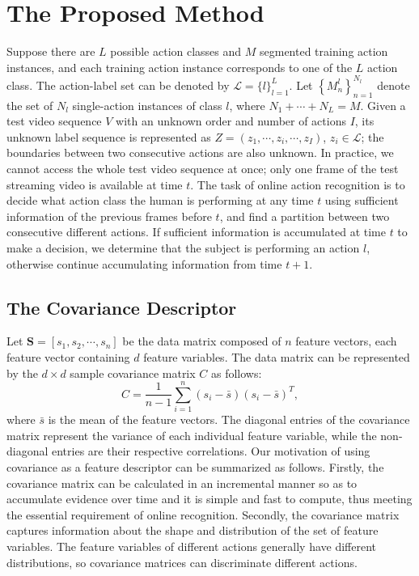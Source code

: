 \documentclass[sigconf]{acmart}
\begin{document}
\section{The Proposed Method}\label{method}
\label{Framework}
Suppose there are $L$ possible action classes and $M$ segmented training action instances, and each training action instance corresponds to one of the $L$ action class. The action-label set can be denoted by $\mathcal{L} = \{ l\} _{l = 1}^L$. Let $\left\{ {M_n^l} \right\}_{n = 1}^{{N_l}}$ denote the set
of $N_l$ single-action instances of class $l$, where ${N_1} +  \cdots  + {N_L} = M$. Given a test video sequence $V$ with an unknown order and number
of actions $I$, its unknown label sequence is represented as $Z = ({z_1}, \cdots ,{z_i}, \cdots ,{z_I})$, $z_i \in \mathcal{L}$; the boundaries between two consecutive actions are also unknown. In practice, we cannot access the whole test video sequence at once; only one frame of the test streaming video is available at time $t$. The task of online action recognition is to decide what action class the human is performing at any time $t$ using sufficient information of the previous frames before $t$, and find a partition between two consecutive different actions. If sufficient information is accumulated at time $t$ to make a decision, we determine that the subject is performing an action $l$, otherwise continue accumulating information from time $t + 1$.

\subsection{The Covariance Descriptor}
\label{CovarianceDescriptor}
Let $\mathbf{S}=[{s_1},{s_2}, \cdots ,{s_n}]$ be the data matrix composed of $n$ feature vectors, each feature vector containing $d$ feature variables. The data matrix can be represented by the $d\times d$ sample covariance matrix $C$ as follows:
\begin{equation}\label{CovDef}
C = \frac{1}{{n - 1}}\sum\limits_{i = 1}^n {\left( {{s_i} - \bar s} \right)} {\left( {{s_i} - \bar s} \right)^T},
\end{equation}
where $\bar s$ is the mean of the feature vectors. The diagonal entries of the covariance matrix represent the variance of each individual feature variable, while the non-diagonal entries are their respective correlations. Our motivation of using covariance as a feature descriptor can be
summarized as follows. Firstly, the covariance matrix can be calculated in an incremental manner so as to accumulate evidence over time and it is simple and fast to compute, thus meeting the essential requirement of online recognition. Secondly, the covariance matrix captures information about the shape and distribution of the set of feature variables. The feature variables of different actions generally have different distributions, so covariance matrices can discriminate different actions.
\end{document}
